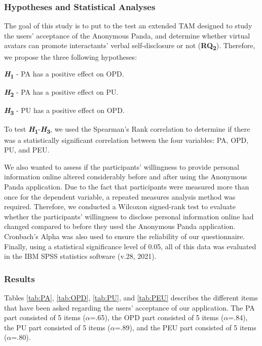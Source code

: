 \subsubsection{Hypotheses and Statistical Analyses}
The goal of this study is to put to the test an extended TAM designed to study the users' acceptance of the Anonymous Panda, and determine whether virtual avatars can promote interactants' verbal self-disclosure or not (\textbf{RQ\textsubscript{2}}). Therefore, we propose the three following hypotheses:

\textbf{\textit{H}\textsubscript{1}} - PA has a positive effect on OPD.

\textbf{\textit{H}\textsubscript{2}} - PA has a positive effect on PU.

\textbf{\textit{H}\textsubscript{3}} - PU has a positive effect on OPD.

To test \textbf{\textit{H}\textsubscript{1}}-\textbf{\textit{H}\textsubscript{3}}, we used the Spearman's Rank correlation to determine if there was a statistically significant correlation between the four variables: PA, OPD, PU, and PEU.

We also wanted to assess if the participants' willingness to provide personal information online altered considerably before and after using the Anonymous Panda application. Due to the fact that participants were measured more than once for the dependent variable, a repeated measures analysis method was required. Therefore, we conducted a Wilcoxon signed-rank test to evaluate whether the participants' willingness to disclose personal information online had changed compared to before they used the Anonymous Panda application. Cronbach's Alpha was also used to ensure the reliability of our questionnaire. Finally, using a statistical significance level of 0.05, all of this data was evaluated in the IBM SPSS statistics software (v.28, 2021).

\subsubsection{Results}
Tables \ref{tab:PA}, \ref{tab:OPD}, \ref{tab:PU}, and \ref{tab:PEU} describes the different items that have been asked regarding the users' acceptance of our application. The PA part consisted of 5 items ($\alpha$=.65), the OPD part consisted of 5 items ($\alpha$=.84), the PU part consisted of 5 items ($\alpha$=.89), and the PEU part consisted of 5 items ($\alpha$=.80).

